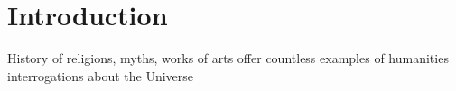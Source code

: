 
\chapter*{Introduction} %


\label{Introduction} %



History of religions, myths, works of arts offer countless examples of humanities interrogations about the Universe


